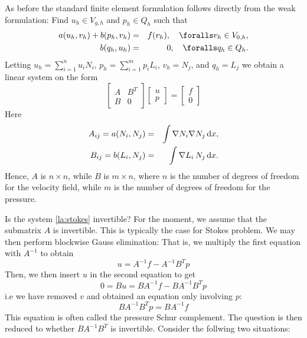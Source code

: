 As before the standard finite element formulation follows directly from the weak formulation:
Find $u_h\in V_{g,h}$ and $p_h\in Q_h$ such that
\begin{eqnarray}
\label{eq:stdGalerkin1}
a(u_h, v_h ) + b(p_h, v_h) &=& f(v_h),\quad \foralls v_h\in V_{0,h}, \\
\label{eq:stdGalerkin2}
b(q_h, u_h) &=& 0,\quad \foralls q_h \in Q_h .
\end{eqnarray}
Letting $u_h=\sum_{i=1}^n u_i N_i$, $p_h=\sum_{i=1}^m p_i L_i$, $v_h=N_j$, and $q_h=L_j$
we obtain a linear system on the form
\begin{equation}
\left[ %
	\begin{array}{cc}
	A & B^T\\
	B & 0
	\end{array}
\right]
\left[ %
	\begin{array}{c}
	u\\
	p
	\end{array}
\right]
=
\left[ %
	\begin{array}{c}
	f\\
	0
	\end{array}
\right]
\label{la:stokes}
\end{equation}
Here
\begin{eqnarray}
A_{ij} = a(N_i,N_j) &=& \int\nabla N_i \nabla N_j \, \mathrm{d}x, \\
B_{ij} = b(L_i,N_j) &=& \int\nabla L_i \, N_j \, \mathrm{d}x.
\end{eqnarray}
Hence, $A$ is $n\times n$, while $B$ is $m\times n$,
where $n$ is the number of degrees of freedom for the velocity field, while
$m$ is the number of degrees of freedom for the pressure.



Is the system \eqref{la:stokes} invertible?  For the moment, we assume that the submatrix $A$ is invertible. This is typically the case for
Stokes problem. We may then perform blockwise Gauss elimination:
That is,
we multiply the first equation with $A^{-1}$ to obtain
\[u = A^{-1}f - A^{-1}B^Tp\]
Then, we then insert $u$ in the second equation to get
\[0 = Bu = BA^{-1}f - BA^{-1}B^Tp\]
i.e we have removed $v$ and obtained an equation only involving $p$:
\[BA^{-1}B^Tp = BA^{-1}f\]
This equation is often called the pressure Schur complement. The question is then reduced to whether $BA^{-1}B^T$ is invertible.
Consider the follwing two situations:

